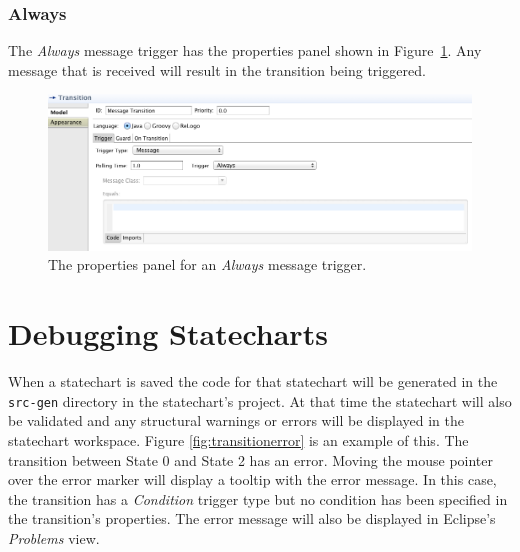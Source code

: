 \documentclass[11pt]{amsart}
\begin{document}
\subsubsection{Always}

The \emph{Always} message trigger has the properties panel shown in Figure~\ref{fig:message4TransitionProperties}. Any message that is received will result in the transition being triggered.

\begin{figure}
\begin{center}
\vspace{.2in}
\centerline {
\includegraphics[width=5in]{StatechartsImages/Message4TransitionProperties.png}
}
\caption{The properties panel for an \emph{Always} message trigger.}
\label{fig:message4TransitionProperties}
\end{center}
\end{figure}
\clearpage

\section{Debugging Statecharts}
When a statechart is saved the code for that statechart will be generated in the \texttt{src-gen} directory in the statechart's project. At that time the statechart will also be validated and any structural warnings or errors will be displayed in the statechart workspace.  Figure \ref{fig:transitionerror} is an example of this. The transition between State 0 and State 2 has an error. Moving the mouse pointer over the error marker will display a tooltip with the error message. In this case, the transition has a \emph{Condition} trigger type but no condition has been specified in the transition's properties. The error message will also be displayed in Eclipse's \emph{Problems} view. 
\end{document}
